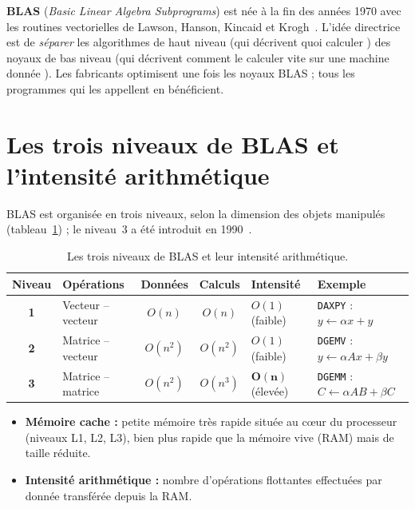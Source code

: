 \documentclass[11pt,a4paper]{report}
\theoremstyle{plain}
\theoremstyle{definition}
\theoremstyle{remark}
\begin{document}
\textbf{BLAS} (\textit{Basic Linear Algebra Subprograms}) est née à la fin des années 1970 avec les routines vectorielles de Lawson, Hanson, Kincaid et Krogh~\cite{blas1979}. L'idée directrice est de \emph{séparer} les algorithmes de haut niveau (qui décrivent \og quoi calculer \fg) des noyaux de bas niveau (qui décrivent \og comment le calculer vite sur une machine donnée \fg). Les fabricants optimisent une fois les noyaux BLAS ; tous les programmes qui les appellent en bénéficient.

\section{Les trois niveaux de BLAS et l'intensité arithmétique}

BLAS est organisée en trois niveaux, selon la dimension des objets manipulés (tableau~\ref{tab:blas_levels}) ; le niveau~3 a été introduit en 1990~\cite{blas1990}.

\begin{table}[ht]
\centering
\caption{Les trois niveaux de BLAS et leur intensité arithmétique.}
\label{tab:blas_levels}
\begin{tabularx}{\textwidth}{c l c c l X}
\toprule
\textbf{Niveau} & \textbf{Opérations} & \textbf{Données} & \textbf{Calculs} & \textbf{Intensité} & \textbf{Exemple} \\
\midrule
\textbf{1} & Vecteur -- vecteur & $O(n)$ & $O(n)$ & $O(1)$ (faible) & \texttt{DAXPY} : $y \leftarrow \alpha x + y$ \\
\textbf{2} & Matrice -- vecteur & $O(n^2)$ & $O(n^2)$ & $O(1)$ (faible) & \texttt{DGEMV} : $y \leftarrow \alpha A x + \beta y$ \\
\textbf{3} & Matrice -- matrice & $O(n^2)$ & $O(n^3)$ & $\mathbf{O(n)}$ (élevée) & \texttt{DGEMM} : $C \leftarrow \alpha A B + \beta C$ \\
\bottomrule
\end{tabularx}
\end{table}

\begin{cadreconcept}
\begin{itemize}
    \item \textbf{Mémoire cache :} petite mémoire très rapide située au cœur du processeur (niveaux L1, L2, L3), bien plus rapide que la mémoire vive (RAM) mais de taille réduite.
    \item \textbf{Intensité arithmétique :} nombre d'opérations flottantes effectuées par donnée transférée depuis la RAM.
\end{itemize}
\end{cadreconcept}
\end{document}

